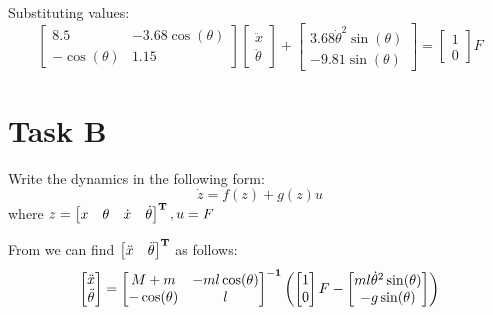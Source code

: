 \documentclass[12pt,letterpaper]{article}
\begin{document}
    Substituting values:
    \begin{equation*}
        \begin{bmatrix}
            8.5 & -3.68\cos(\theta) \\ 
            -\cos(\theta) & 1.15 
        \end{bmatrix}
        \begin{bmatrix}
            \ddot x \\ \ddot \theta 
        \end{bmatrix}
        +
        \begin{bmatrix}
            3.68 \dot \theta^2\sin(\theta)  \\ -9.81\sin(\theta) 
        \end{bmatrix}
        =
        \begin{bmatrix}
            1 \\ 0 
        \end{bmatrix}
        F
    \end{equation*}
    
\section*{Task B}
\label{Q:B}
    Write the dynamics in the following form:
    \begin{equation*}
        \dot z = f(z) + g(z) u
    \end{equation*}
    where $z = \begin{bmatrix}
        x & \theta & \dot x & \dot \theta 
    \end{bmatrix}  ^\mathbf{T}, u = F$
    
    From  we can find $ \begin{bmatrix}
         \ddot x & \ddot \theta 
    \end{bmatrix}  ^\mathbf{T}$
    as follows:
    \begin{equation*}
        \begin{bmatrix}
            \ddot x \\ \ddot \theta 
        \end{bmatrix}
        =
        \begin{bmatrix}
            M+m & -ml\cos(\theta) \\ 
            -\cos(\theta) & l 
        \end{bmatrix} ^\mathbf{-1}
        \left(
            \begin{bmatrix}
             1 \\ 0 
            \end{bmatrix}
            F
            -
            \begin{bmatrix}
                ml \dot \theta^2\sin(\theta)  \\ -g\sin(\theta) 
            \end{bmatrix}
        \right)
    \end{equation*}
    
\end{document}
